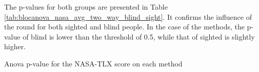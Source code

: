 The p-values for both groups are presented in Table \ref{tab:blocanova_nasa_avg_two_way_blind_sight}. It confirms the influence of the round for both sighted and blind people. In the case of the methods, the p-value of blind is lower than the threshold of 0.5, while that of sighted is slightly higher.

\begin{table}[!thb]
    \caption{Anova p-value for the NASA-TLX score on each method}
    \label{tab:blocanova_nasa_avg_two_way_blind_sight}
    \begin{minipage}{0.45\linewidth}
        
    \end{minipage}%
    \begin{minipage}{0.05\linewidth}
        \hfill
    \end{minipage}%
    \begin{minipage}{0.45\linewidth}
            
    \end{minipage}
\end{table}



